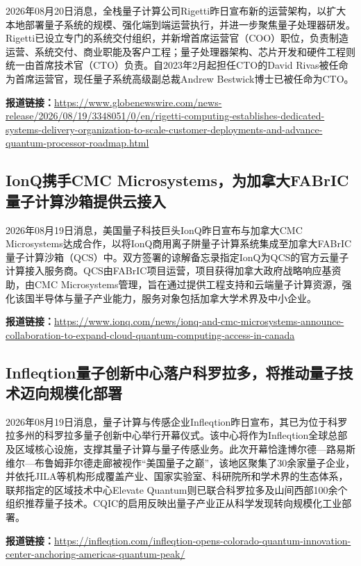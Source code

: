\documentclass[12pt,a4paper]{ctexart}
\begin{document}
2026年08月20日消息，全栈量子计算公司Rigetti昨日宣布新的运营架构，以扩大本地部署量子系统的规模、强化端到端运营执行，并进一步聚焦量子处理器研发。Rigetti已设立专门的系统交付组织，并新增首席运营官（COO）职位，负责制造运营、系统交付、商业职能及客户工程；量子处理器架构、芯片开发和硬件工程则统一由首席技术官（CTO）负责。自2023年2月起担任CTO的David Rivas被任命为首席运营官，现任量子系统高级副总裁Andrew Bestwick博士已被任命为CTO。

\noindent\textbf{报道链接：}\url{https://www.globenewswire.com/news-release/2026/08/19/3348051/0/en/rigetti-computing-establishes-dedicated-systems-delivery-organization-to-scale-customer-deployments-and-advance-quantum-processor-roadmap.html}

\subsection{ IonQ携手CMC Microsystems，为加拿大FABrIC量子计算沙箱提供云接入 }

2026年08月19日消息，美国量子科技巨头IonQ昨日宣布与加拿大CMC Microsystems达成合作，以将IonQ商用离子阱量子计算系统集成至加拿大FABrIC量子计算沙箱（QCS）中。双方签署的谅解备忘录指定IonQ为QCS的官方云量子计算接入服务商。QCS由FABrIC项目运营，项目获得加拿大政府战略响应基资助，由CMC Microsystems管理，旨在通过提供工程支持和云端量子计算资源，强化该国半导体与量子产业能力，服务对象包括加拿大学术界及中小企业。

\noindent\textbf{报道链接：}\url{https://www.ionq.com/news/ionq-and-cmc-microsystems-announce-collaboration-to-expand-cloud-quantum-computing-access-in-canada}

\subsection{ Infleqtion量子创新中心落户科罗拉多，将推动量子技术迈向规模化部署 }

2026年08月19日消息，量子计算与传感企业Infleqtion昨日宣布，其已为位于科罗拉多州的科罗拉多量子创新中心举行开幕仪式。该中心将作为Infleqtion全球总部及区域核心设施，支撑其量子计算与量子传感业务。此次开幕恰逢博尔德—路易斯维尔—布鲁姆菲尔德走廊被视作“美国量子之巅”，该地区聚集了30余家量子企业，并依托JILA等机构形成覆盖产业、国家实验室、科研院所和学术界的生态体系，联邦指定的区域技术中心Elevate Quantum则已联合科罗拉多及山间西部100余个组织推荐量子技术。CQIC的启用反映出量子产业正从科学发现转向规模化工业部署。

\noindent\textbf{报道链接：}\url{https://infleqtion.com/infleqtion-opens-colorado-quantum-innovation-center-anchoring-americas-quantum-peak/}
\end{document}
